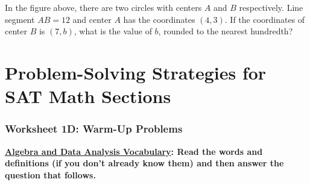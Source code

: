\documentclass[12pt]{book}
\begin{document}
\begin{multienumerate}
{In the figure above, there are two circles with centers $A$ and $B$ respectively. Line segment $AB=12$ and center $A$ has the coordinates $(4, 3)$. If the coordinates of center $B$ is $(7, b)$, what is the value of $b$, rounded to the nearest hundredth?}
\end{multienumerate}


\chapter[Problem-Solving Strategies]{Problem-Solving Strategies for SAT Math Sections}

\subsection{Worksheet 1D: Warm-Up Problems}

\bigskip
\textbf{\underline{Algebra and Data Analysis Vocabulary}: Read the words and definitions (if you don't already know them) and then answer the question that follows.}
\end{document}
